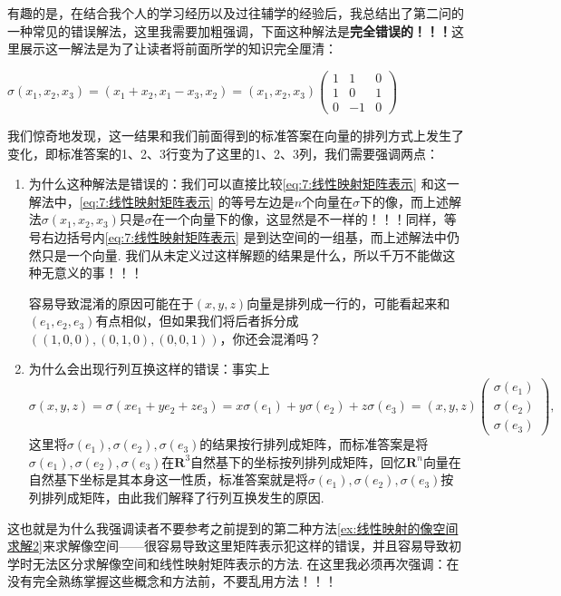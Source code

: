 有趣的是，在结合我个人的学习经历以及过往辅学的经验后，我总结出了第二问的一种常见的错误解法，这里我需要加粗强调，下面这种解法是\textbf{完全错误的！！！}这里展示这一解法是为了让读者将前面所学的知识完全厘清：

\begin{solution}[错误解法！！！]
    $\sigma(x_1,x_2,x_3)=(x_1+x_2,x_1-x_3, x_2)=(x_1,x_2,x_3)\begin{pmatrix}
            1 & 1  & 0 \\
            1 & 0  & 1 \\
            0 & -1 & 0
        \end{pmatrix}$
\end{solution}

我们惊奇地发现，这一结果和我们前面得到的标准答案在向量的排列方式上发生了变化，即标准答案的1、2、3行变为了这里的1、2、3列，我们需要强调两点：
\begin{enumerate}
    \item 为什么这种解法是错误的：我们可以直接比较\autoref{eq:7:线性映射矩阵表示} 和这一解法中，\autoref*{eq:7:线性映射矩阵表示} 的等号左边是$n$个向量在$\sigma$下的像，而上述解法$\sigma(x_1,x_2,x_3)$只是$\sigma$在一个向量下的像，这显然是不一样的！！！同样，等号右边括号内\autoref*{eq:7:线性映射矩阵表示} 是到达空间的一组基，而上述解法中仍然只是一个向量. 我们从未定义过这样解题的结果是什么，所以千万不能做这种无意义的事！！！

          容易导致混淆的原因可能在于$(x,y,z)$向量是排列成一行的，可能看起来和$(e_1,e_2,e_3)$有点相似，但如果我们将后者拆分成$((1,0,0),(0,1,0),(0,0,1))$，你还会混淆吗？

    \item 为什么会出现行列互换这样的错误：事实上
          \[\sigma(x,y,z)=\sigma(xe_1+ye_2+ze_3)=x\sigma(e_1)+y\sigma(e_2)+z\sigma(e_3)=(x,y,z)\begin{pmatrix}
                  \sigma(e_1) \\ \sigma(e_2) \\ \sigma(e_3)
              \end{pmatrix},\]
          这里将$\sigma(e_1),\sigma(e_2),\sigma(e_3)$的结果按行排列成矩阵，而标准答案是将$\sigma(e_1),\sigma(e_2),\sigma(e_3)$在$\mathbf{R}^3$自然基下的坐标按列排列成矩阵，回忆$\mathbf{R}^n$向量在自然基下坐标是其本身这一性质，标准答案就是将$\sigma(e_1),\sigma(e_2),\sigma(e_3)$按列排列成矩阵，由此我们解释了行列互换发生的原因.
\end{enumerate}

这也就是为什么我强调读者不要参考之前提到的第二种方法\autoref{ex:线性映射的像空间求解2}来求解像空间——很容易导致这里矩阵表示犯这样的错误，并且容易导致初学时无法区分求解像空间和线性映射矩阵表示的方法. 在这里我必须再次强调：在没有完全熟练掌握这些概念和方法前，不要乱用方法！！！


